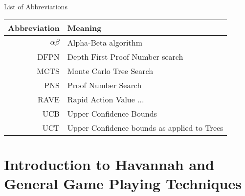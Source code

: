 \documentclass[12pt, letterpaper]{report}
\numberwithin{equation}{section}
\begin{document}
	\section*{}
	\begin{flushright}
		\huge{List of Abbreviations}
	\end{flushright}
	\vspace{0.4in}
	\begin{center}
		\begin{tabular}{rl}
			Abbreviation & Meaning \\
			\hline
			$\alpha\beta$ & Alpha-Beta algorithm \\
			DFPN		& Depth First Proof Number search \\
			MCTS		& Monte Carlo Tree Search \\
			PNS			& Proof Number Search \\
			RAVE		& Rapid Action Value ... \\
			UCB			& Upper Confidence Bounds \\
			UCT			& Upper Confidence bounds as applied to Trees \\

		\end{tabular}
	\end{center}	
	
	
	

	\newpage
	\setcounter{page}{1}
	
	\chapter[Introduction]{\label{intro} \LARGE Introduction to Havannah and \\ General Game Playing Techniques}
	
	
\end{document}
